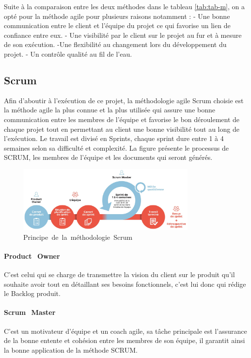 Suite à la comparaison entre les deux méthodes dans le tableau \ref{tab:tab-m}, on a opté pour la méthode agile pour plusieurs raisons notamment : 
- Une bonne communication entre le client et l’équipe du projet ce qui favorise un lien de confiance entre eux. 
- Une visibilité par le client sur le projet au fur et à mesure de son exécution. 
-Une flexibilité au changement lors du développement du projet. 
- Un contrôle qualité au fil de l’eau.

\subsection{Scrum}
Afin d’aboutir à l’exécution de ce projet, la méthodologie agile Scrum choisie est la méthode agile la plus connue et la plus utilisée qui assure une bonne communication entre les membres de l’équipe et favorise le bon déroulement de chaque projet tout en permettant au client une bonne visibilité tout au long de l’exécution.
 Le travail est divisé en Sprints, chaque sprint dure entre 1 à 4 semaines selon sa difficulté et complexité. La figure présente le processus de SCRUM, les membres de l’équipe et les documents qui seront générés.
\begin{figure}[!ht]\centering
\includegraphics[width=0.8\textwidth]{chapitres/chapitre2/figures/scrum.jpeg}
\caption{Principe\textcolor{white}{J}de\textcolor{white}{J}la\textcolor{white}{J}méthodologie\textcolor{white}{J}Scrum}
\label{fig:fig2}
\end{figure}

\newpage
\paragraph{Product\textcolor{white}{I} Owner} 
C’est celui qui se charge de transmettre la vision du client sur le produit qu’il souhaite avoir tout en détaillant ses besoins fonctionnels, c’est lui donc qui rédige le Backlog produit.

\paragraph{Scrum\textcolor{white}{I} Master}
C’est un motivateur d’équipe et un coach agile, sa tâche principale est l’assurance de la bonne entente et cohésion entre les membres de son équipe, il garantit ainsi la bonne application de la méthode SCRUM.



